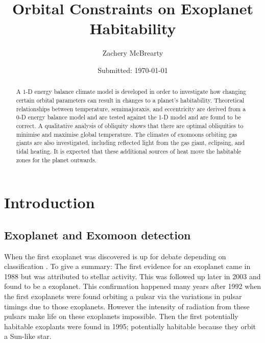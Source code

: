 \documentclass[12pt, onecolumn]{revtex4-2}    %
\begin{document}
\title{Orbital Constraints on Exoplanet Habitability}
\date{Submitted: \today{}}
\author{Zachery McBrearty}

\begin{abstract}
  A 1-D energy balance climate model is developed in order to investigate how changing certain orbital parameters can result in changes to a planet's habitability.
  Theoretical relationships between temperature, semimajoraxis, and eccentricity are derived from a 0-D energy balance model and are tested against the 1-D model and are found to be correct.
  A qualitative analysis of obliquity shows that there are optimal obliquities to minimise and maximise global temperature.
  The climates of exomoons orbiting gas giants are also investigated, including reflected light from the gas giant, eclipsing, and tidal heating.
  It is expected that these additional sources of heat move the habitable zones for the planet outwards.
\end{abstract}


\maketitle

\tableofcontents

\newpage


\section{Introduction} \label{sec:Introduction} %
%
\subsection{Exoplanet and Exomoon detection}
%
When the first exoplanet was discovered is up for debate depending on classification \cite{ESA_2019}.
To give a summary:
The first evidence for an exoplanet came in 1988 but was attributed to stellar activity.
This was followed up later in 2003 and found to be a exoplanet.
This confirmation happened many years after 1992 when the first exoplanets were found orbiting a pulsar via the variations in pulsar timings due to those exoplanets.
However the intensity of radiation from these pulsars make life on these exoplanets impossible.
Then the first potentially habitable exoplants were found in 1995; potentially habitable because they orbit a Sun-like star.
\end{document}
